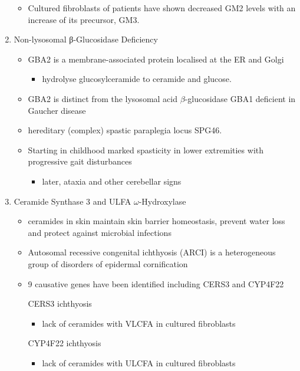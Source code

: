 \documentclass{scrartcl}
\begin{document}
\begin{enumerate}
\begin{itemize}
\item Cultured fibroblasts of patients have shown decreased GM2 levels
with an increase of its precursor, GM3.
\end{itemize}

\item Non-lysosomal β-Glucosidase Deficiency
\label{sec:org06c6e24}

\begin{itemize}
\item GBA2 is a membrane-associated protein localised at the ER and Golgi
\begin{itemize}
\item hydrolyse glucosylceramide to ceramide and glucose.
\end{itemize}
\item GBA2 is distinct from the lysosomal acid \(\beta\)-glucosidase GBA1 deficient in Gaucher disease
\item hereditary (complex) spastic paraplegia locus SPG46.
\item Starting in childhood marked spasticity in lower extremities with
progressive gait disturbances
\begin{itemize}
\item later, ataxia and other cerebellar signs
\end{itemize}
\end{itemize}

\item Ceramide Synthase 3 and ULFA \(\omega\)-Hydroxylase
\label{sec:org3ef0b22}

\begin{itemize}
\item ceramides in skin maintain skin barrier homeostasis, prevent water
loss and protect against microbial infections
\item Autosomal recessive congenital ichthyosis (ARCI) is a heterogeneous
group of disorders of epidermal cornification
\item 9 causative genes have been identified including CERS3 and CYP4F22

\item[{CERS3}] ichthyosis
\begin{itemize}
\item lack of ceramides with VLCFA in cultured fibroblasts
\end{itemize}
\item[{CYP4F22}] ichthyosis
\begin{itemize}
\item lack of ceramides with ULCFA in cultured fibroblasts
\end{itemize}
\end{itemize}
\end{enumerate}
\end{document}
